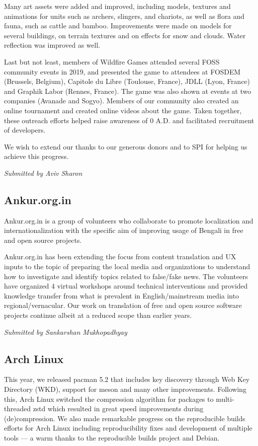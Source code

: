 \documentclass[a4paper]{report}
\begin{document}
Many art assets were added and improved, including models, textures and
animations for units such as archers, slingers, and chariots, as well as
flora and fauna, such as cattle and bamboo. Improvements were made on
models for several buildings, on terrain textures and on effects for
snow and clouds. Water reflection was improved as well.

Last but not least, members of Wildfire Games attended several FOSS
community events in 2019, and presented the game to attendees at FOSDEM
(Brussels, Belgium), Capitole du Libre (Toulouse, France), JDLL (Lyon,
France) and Graphik Labor (Rennes, France).  The game was also shown at
events at two companies (Avanade and Sogyo).  Members of our community
also created an online tournament and created online videos about the
game.  Taken together, these outreach efforts helped raise awareness of
0 A.D. and facilitated recruitment of developers.

We wish to extend our thanks to our generous donors and to SPI for
helping us achieve this progress.

{\em Submitted by Aviv Sharon}

\subsection{Ankur.org.in}

Ankur.org.in is a group of volunteers who collaborate to promote
localization and internationalization with the specific aim of improving
usage of Bengali in free and open source projects.

Ankur.org.in has been extending the focus from content translation and
UX inputs to the topic of preparing the local media and organizations to
understand how to investigate and identify topics related to false/fake
news. The volunteers have organized 4 virtual workshops around technical
interventions and provided knowledge transfer from what is prevalent in
English/mainstream media into regional/vernacular. Our work on
translation of free and open source software projects continue albeit at
a reduced scope than earlier years.

{\em Submitted by Sankarshan Mukhopadhyay}

\subsection{Arch Linux}

This year, we released pacman 5.2 that includes key discovery through
Web Key Directory (WKD), support for meson and many other improvements.
Following this, Arch Linux switched the compression algorithm for
packages to multi-threaded zstd which resulted in great speed
improvements during (de)compression.  We also made remarkable progress
on the reproducible builds efforts for Arch Linux including
reproducibility fixes and development of multiple tools --- a warm
thanks to the reproducible builds project and Debian.
\end{document}
